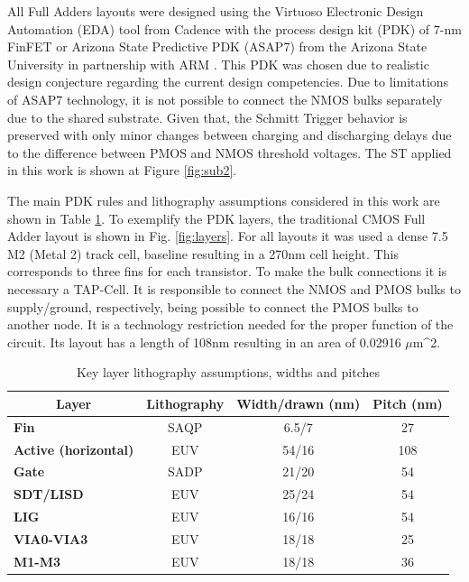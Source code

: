 \documentclass[ecp,tc, english]{iiufrgs}
\begin{document}
All Full Adders layouts were designed using the Virtuoso Electronic Design Automation (EDA) tool from Cadence\textregistered{} with the process design kit (PDK) of 7-nm FinFET or Arizona State Predictive PDK (ASAP7) from the Arizona State University in partnership with ARM \cite{clark2016asap7}. This PDK was chosen due to realistic design conjecture regarding the current design competencies. Due to limitations of ASAP7 technology, it is not possible to connect the NMOS bulks separately due to the shared substrate. Given that, the Schmitt Trigger behavior is preserved with only minor changes between charging and discharging delays due to the difference between PMOS and NMOS threshold voltages. The ST applied in this work is shown at Figure \ref{fig:sub2}.

The main PDK rules and lithography assumptions considered in this work are shown in Table \ref{layers}. To exemplify the PDK layers, the traditional CMOS Full Adder layout is shown in Fig. \ref{fig:layers}. For all layouts it was used a dense 7.5 M2 (Metal 2) track cell, baseline resulting in a 270nm cell height. This corresponds to three fins for each transistor. To make the bulk connections it is necessary a TAP-Cell. It is responsible to connect the NMOS and PMOS bulks to supply/ground, respectively, being possible to connect the PMOS bulks to another node. It is a technology restriction needed for the proper function of the circuit. Its layout has a length of 108nm resulting in an area of 0.02916 \(\mu\)m^{2}.

\begin{table}[H]
\centering
\caption{Key layer lithography assumptions, widths and pitches}
\label{layers}
\begin{tabular}{lccc}
\hline
\multicolumn{1}{c}{\textbf{Layer}} & \textbf{Lithography} & \textbf{Width/drawn (nm)} & \textbf{Pitch (nm)} \\ \hline
\textbf{Fin}                         & SAQP                 & 6.5/7                     & 27                  \\ \hline
\textbf{Active (horizontal)}         & EUV                  & 54/16                     & 108                 \\ \hline
\textbf{Gate}                        & SADP                 & 21/20                     & 54                  \\ \hline
\textbf{SDT/LISD}                    & EUV                  & 25/24                     & 54                  \\ \hline
\textbf{LIG}                         & EUV                  & 16/16                     & 54                  \\ \hline
\textbf{VIA0-VIA3}                   & EUV                  & 18/18                     & 25                  \\ \hline
\textbf{M1-M3}                       & EUV                  & 18/18                     & 36                  \\ \hline
\end{tabular}

\end{table}
\end{document}
